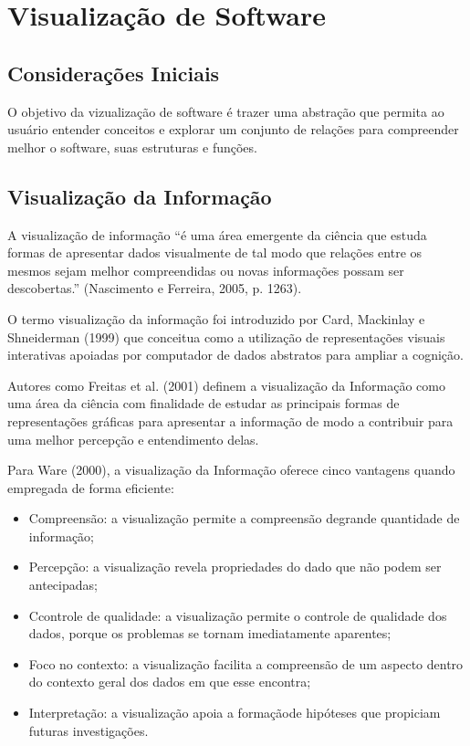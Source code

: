 \chapter{Visualização de Software}
\label{cap-proposta}


\section{Considerações Iniciais}

O objetivo da vizualização de software é trazer uma abstração que permita ao
usuário entender conceitos e explorar um conjunto de relações para compreender
melhor o software, suas estruturas e funções.

\section{Visualização da Informação}

A visualização de informação “é uma área emergente da ciência que estuda
formas de apresentar dados visualmente de tal modo que relações entre os mesmos
sejam melhor compreendidas ou novas informações possam ser descobertas.”
(Nascimento e Ferreira, 2005, p. 1263).

O termo visualização da informação foi introduzido por Card, Mackinlay e
Shneiderman (1999) que conceitua como a utilização de representações visuais
interativas apoiadas por computador de dados abstratos para ampliar a cognição.

Autores como Freitas et al. (2001) definem a visualização da Informação como
uma área da ciência com finalidade de estudar as principais formas de
representações gráficas para apresentar a informação de modo a contribuir para
uma melhor percepção e entendimento delas.

Para Ware (2000), a visualização da Informação oferece cinco vantagens quando
empregada de forma eficiente:

\begin{itemize}
  \item Compreensão: a visualização permite a compreensão degrande quantidade de informação;
  \item Percepção: a visualização revela propriedades do dado que não podem ser antecipadas;
  \item Ccontrole de qualidade: a visualização permite o controle de qualidade dos dados,
   porque os problemas se tornam imediatamente aparentes;
  \item Foco no contexto: a visualização facilita a compreensão de um aspecto dentro do contexto
  geral dos dados em que esse encontra;
  \item Interpretação: a visualização apoia a formaçãode hipóteses que propiciam futuras investigações.
\end{itemize}

